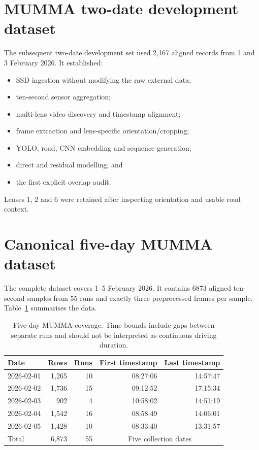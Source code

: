 \documentclass[11pt,a4paper,oneside]{report}
\begin{document}
\section{MUMMA two-date development dataset}
The subsequent two-date development set used 2,167 aligned records from 1 and
3 February 2026. It
established:
\begin{itemize}
  \item SSD ingestion without modifying the raw external data;
  \item ten-second sensor aggregation;
  \item multi-lens video discovery and timestamp alignment;
  \item frame extraction and lens-specific orientation/cropping;
  \item YOLO, road, CNN embedding and sequence generation;
  \item direct and residual modelling; and
  \item the first explicit overlap audit.
\end{itemize}
Lenses 1, 2 and 6 were retained after inspecting orientation and usable road
context.

\section{Canonical five-day MUMMA dataset}
The complete dataset covers 1--5 February 2026. It contains \num{6873} aligned
ten-second samples from 55 runs and exactly three preprocessed frames per sample.
Table~\ref{tab:dailycoverage} summarises the data.

\begin{table}[H]
  \centering
  \caption{Five-day MUMMA coverage. Time bounds include gaps between separate
  runs and should not be interpreted as continuous driving duration.}
  \label{tab:dailycoverage}
  \begin{tabular}{lrrrr}
    \toprule
    Date & Rows & Runs & First timestamp & Last timestamp\\
    \midrule
    2026-02-01 & 1,265 & 10 & 08:27:06 & 14:57:47\\
    2026-02-02 & 1,736 & 15 & 09:12:52 & 17:15:34\\
    2026-02-03 &   902 &  4 & 10:58:02 & 14:51:19\\
    2026-02-04 & 1,542 & 16 & 08:58:49 & 14:06:01\\
    2026-02-05 & 1,428 & 10 & 08:33:40 & 13:31:57\\
    \midrule
    Total & 6,873 & 55 & \multicolumn{2}{c}{Five collection dates}\\
    \bottomrule
  \end{tabular}
\end{table}
\end{document}
